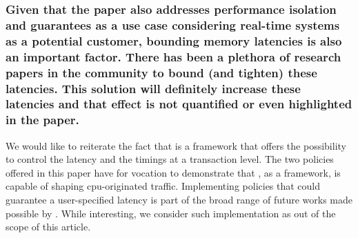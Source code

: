         \subsubsection{Given that the paper also addresses performance isolation and guarantees as a use case considering real-time systems as a potential customer, bounding memory latencies is also an important factor. There has been a plethora of research papers in the community to bound (and tighten) these latencies. This solution will definitely increase these latencies and that effect is not quantified or even highlighted in the paper.}
            We would like to reiterate the fact that \schim is a framework that offers the possibility to control the latency and the timings at a transaction level.
            The two policies offered in this paper have for vocation to demonstrate that \schim, as a framework, is capable of shaping cpu-originated traffic.
            Implementing policies that could guarantee a user-specified latency is part of the broad range of future works made possible by \schim.
            While interesting, we consider such implementation as out of the scope of this article.


